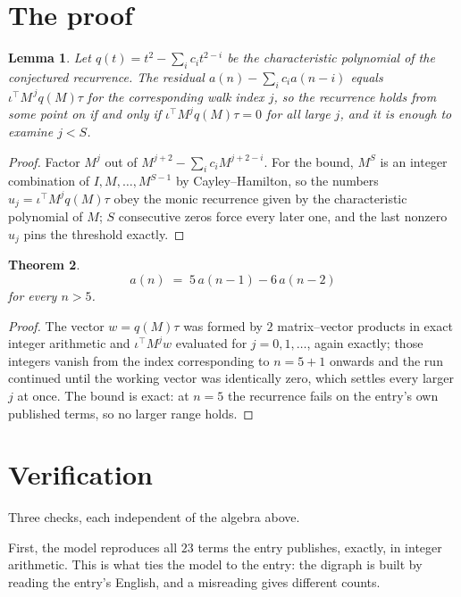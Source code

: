 \documentclass[11pt,a4paper]{article}
\theoremstyle{plain}
\newtheorem{theorem}{Theorem}
\newtheorem{lemma}[theorem]{Lemma}
\theoremstyle{definition}
\begin{document}
\section{The proof}

\begin{lemma}\label{lem:crit}
Let $q(t)=t^{2}-\sum_i c_it^{2-i}$ be the characteristic polynomial of the
conjectured recurrence. The residual $a(n)-\sum_ic_ia(n-i)$ equals
$\iota^{\!\top}M^{\,j}q(M)\tau$ for the corresponding walk index $j$, so the recurrence
holds from some point on if and only if $\iota^{\!\top}M^{j}q(M)\tau=0$ for all large $j$,
and it is enough to examine $j<S$.
\end{lemma}

\begin{proof}
Factor $M^{j}$ out of $M^{j+2}-\sum_ic_iM^{j+2-i}$. For the bound, $M^{S}$
is an integer combination of $I,M,\dots,M^{S-1}$ by Cayley--Hamilton, so the numbers
$u_j=\iota^{\!\top}M^{j}q(M)\tau$ obey the monic recurrence given by the characteristic
polynomial of $M$; $S$ consecutive zeros force every later one, and the last nonzero $u_j$
pins the threshold exactly.
\end{proof}

\begin{theorem}
\[
a(n)\;=\;5\,a(n-1) - 6\,a(n-2)
\]
for every $n>5$.
\end{theorem}

\begin{proof}
The vector $w=q(M)\tau$ was formed by $2$ matrix--vector products in exact integer
arithmetic and $\iota^{\!\top}M^{j}w$ evaluated for $j=0,1,\dots$, again exactly; those
integers vanish from the index corresponding to $n=5+1$ onwards and the run continued
until the working vector was identically zero, which settles every larger $j$ at once. The bound is exact: at $n=5$ the recurrence fails on the entry's own published terms, so no larger range holds.
\end{proof}

\section{Verification}

Three checks, each independent of the algebra above.

First, the model reproduces all $23$ terms the entry publishes, exactly, in integer
arithmetic. This is what ties the model to the entry: the digraph is built by reading the
entry's English, and a misreading gives different counts.
\end{document}

